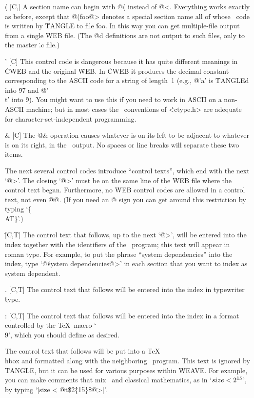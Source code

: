 \@( [C,\oT] A section name can begin with \.{@(} instead of \.{@<}.
Everything works exactly as before, except that \.{@(foo@>} denotes
a special section name all of whose \Cee\ code is written by \.{TANGLE}
to file \.{foo}. In this way you can get multiple-file output from
a single \.{WEB} file. (The \.{@d} definitions are not output
to such files, only to the master \.{.c} file.)

\@' [C] This control code is dangerous because it has quite different
meanings in \.{CWEB} and the original \.{WEB}. In \.{CWEB} it produces the
decimal constant corresponding to the ASCII code for a string of length~1
(e.g., \.{@'a'} is \.{TANGLE}d into \.{97} and \.{@'\\t'} into
\.9). You might want to use this if you need to work in ASCII on a
non-ASCII machine; but in most cases the \Cee\ conventions of
\.{<ctype.h>} are adequate for character-set-independent programming.

\@\& [C] The \.{@\&} operation causes whatever is on its left to be
adjacent to whatever is on its right, in the \Cee\ output. No spaces or
line breaks will separate these two items.

\yskip \noindent
The next several control codes introduce ``control
texts'', which end with the next `\.{@>}'.  The closing `\.{@>}' must
be on the same line of the \.{WEB} file where the control text began.
Furthermore, no \.{WEB} control codes are allowed in a control text,
not even \.{@@}. (If you need an \.{@} sign you can get around this
restriction by typing `\.{\{\\AT\}}'.)

\@\^ [C,T] The control text that follows, up to the next
`\.{@>}', will be entered into the index together with the identifiers of
the \Cee\ program; this text will appear in roman type. For example, to
put the phrase ``system dependencies'' into the index, type
`\.{@\^system dependencies@>}' in each section
that you want to index as system dependent.

\@. [C,T] The control text that follows will be entered into the index
in \.{typewriter} \.{type}.

\@: [C,T] The control text that follows will be entered into the index
in a format controlled by the \TeX\ macro `\.{\\9}', which you
should define as desired.

\@t [C] The control text that follows will
be put into a \TeX\ \.{\\hbox} and formatted along with the neighboring
\Cee\ program. This text is ignored by \.{TANGLE}, but it can be used
for various purposes within \.{WEAVE}. For example, you can make comments
that mix \Cee\ and classical mathematics, as in `$\\{size}<2^{15}$', by
typing `\.{|size < @t\$2\^\{15\}\$@>|}'.

